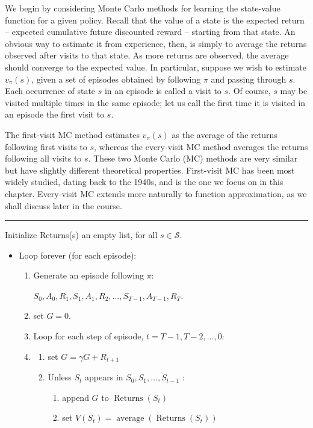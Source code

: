 \documentclass[11pt]{article}
\theoremstyle{plain} %
\theoremstyle{remark}
\begin{document}
   We begin by considering Monte Carlo methods for learning the
        state-value function for a given policy. Recall that the value of a state is the expected return -- expected
        cumulative future discounted reward -- starting from that state. An obvious way to estimate it from experience, then, is simply to
        average the returns observed after visits to that state. As more returns are observed, the average should converge to the
        expected value. In particular, suppose we wish to estimate $v_{\pi}(s)$, given a set
        of episodes obtained by following $\pi$ and passing through $s$. {\color{C3}Each occurrence of state $s$ in an episode is called a visit to $s$.} Of course, $s$ may be visited multiple times in the same episode; let
        us call the first time it is visited in an episode the first visit to $s$.

   The {\color{C3}first-visit MC method} estimates $v_{\pi}(s)$ as the average of the
        returns following first visits to $s$, whereas the {\color{C3}every-visit MC method}
        averages the returns following all visits to $s$. These two Monte Carlo (MC) methods are very similar but have slightly
        different theoretical properties. First-visit MC has been most widely studied, dating back to the 1940s,
        and is the one we focus on in this chapter. Every-visit MC extends more naturally to function approximation, as we
        shall discuss later in the course.  
  
\vspace*{0.65em}
\hrule
  
  Initialize Returns(s) an empty list, for all $s \in \mathcal{S}$.
  \begin{itemize}
    \item Loop forever (for each episode):
    \begin{enumerate}[label=(\arabic*)]
      \item Generate an episode following $\pi$:
      
            $S_{0}, A_{0}, R_{1}, S_{1}, A_{1}, R_{2}, \ldots, S_{T-1}, A_{T-1}, R_{T}$.
      \item set $G=0$.
      \item Loop for each step of episode, $t=T-1, T-2, \ldots, 0$:
      \item \begin{enumerate}[label=(\arabic*)]
        \item set $G=\gamma G+R_{t+1}$
        \item Unless $S_{t}$ appears in $S_{0}, S_{1}, \ldots, S_{t-1}$ :
        \begin{enumerate}[label=(\arabic*)]
          \item append $G$ to $\operatorname{Returns}\left(S_{t}\right)$
          \item set
          $V\left(S_{t}\right)=\operatorname{average}\left(\operatorname{Returns}\left(S_{t}\right)\right)$
        \end{enumerate}
      \end{enumerate}
    \end{enumerate}
  \end{itemize}
  
\end{document}

